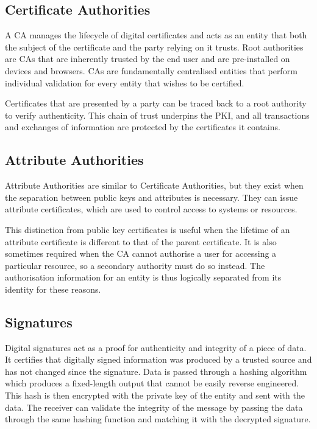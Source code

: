 \subsection{Certificate Authorities}
A \ac{CA} manages the lifecycle of digital certificates and acts as an entity that both the subject of the certificate and the party relying on it trusts. Root authorities are \acp{CA} that are inherently trusted by the end user and are pre-installed on devices and browsers. \acp{CA} are fundamentally centralised entities that perform individual validation for every entity that wishes to be certified.

Certificates that are presented by a party can be traced back to a root authority to verify authenticity. This chain of trust underpins the \ac{PKI}, and all transactions and exchanges of information are protected by the certificates it contains.

\subsection{Attribute Authorities}
Attribute Authorities \cite{farrell_internet_2002} are similar to Certificate Authorities, but they exist when the separation between public keys and attributes is necessary. They can issue attribute certificates, which are used to control access to systems or resources. 

This distinction from public key certificates is useful when the lifetime of an attribute certificate is different to that of the parent certificate. It is also sometimes required when the \ac{CA} cannot authorise a user for accessing a particular resource, so a secondary authority must do so instead. The authorisation information for an entity is thus logically separated from its identity for these reasons.

\subsection{Signatures}
Digital signatures act as a proof for authenticity and integrity of a piece of data. It certifies that digitally signed information was produced by a trusted source and has not changed since the signature. Data is passed through a hashing algorithm which produces a fixed-length output that cannot be easily reverse engineered. This hash is then encrypted with the private key of the entity and sent with the data. The receiver can validate the integrity of the message by passing the data through the same hashing function and matching it with the decrypted signature.

